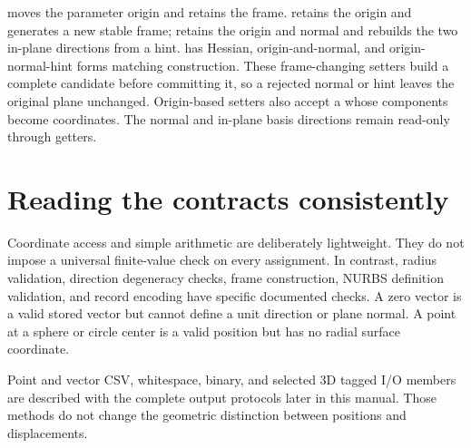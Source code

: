  moves the parameter origin and retains the frame.
 retains the origin and generates a new stable frame;
 retains the origin and normal and rebuilds the two
in-plane directions from a hint.  has Hessian,
origin-and-normal, and origin-normal-hint forms matching construction. These
frame-changing setters build a complete candidate before committing it, so
a rejected normal or hint leaves the original plane unchanged. Origin-based
setters also accept a  whose components become coordinates.
The normal and in-plane basis directions remain read-only through getters.

\section{Reading the contracts consistently}

Coordinate access and simple arithmetic are deliberately lightweight. They
do not impose a universal finite-value check on every assignment. In
contrast, radius validation, direction degeneracy checks, frame construction,
NURBS definition validation, and record encoding have specific documented
checks. A zero vector is a valid stored vector but cannot define a unit
direction or plane normal. A point at a sphere or circle center is a valid
position but has no radial surface coordinate.

Point and vector CSV, whitespace, binary, and selected 3D tagged I/O members
are described with the complete output protocols later in this manual.
Those methods do not change the geometric distinction between positions and
displacements.
